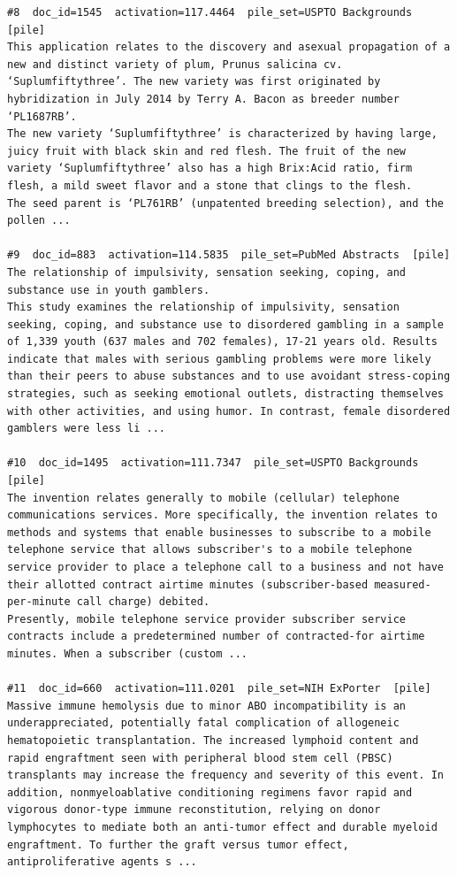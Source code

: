 \begin{verbatim}
#8  doc_id=1545  activation=117.4464  pile_set=USPTO Backgrounds  [pile]
This application relates to the discovery and asexual propagation of a new and distinct variety of plum, Prunus salicina cv. ‘Suplumfiftythree’. The new variety was first originated by hybridization in July 2014 by Terry A. Bacon as breeder number ‘PL1687RB’.
The new variety ‘Suplumfiftythree’ is characterized by having large, juicy fruit with black skin and red flesh. The fruit of the new variety ‘Suplumfiftythree’ also has a high Brix:Acid ratio, firm flesh, a mild sweet flavor and a stone that clings to the flesh.
The seed parent is ‘PL761RB’ (unpatented breeding selection), and the pollen ...

#9  doc_id=883  activation=114.5835  pile_set=PubMed Abstracts  [pile]
The relationship of impulsivity, sensation seeking, coping, and substance use in youth gamblers.
This study examines the relationship of impulsivity, sensation seeking, coping, and substance use to disordered gambling in a sample of 1,339 youth (637 males and 702 females), 17-21 years old. Results indicate that males with serious gambling problems were more likely than their peers to abuse substances and to use avoidant stress-coping strategies, such as seeking emotional outlets, distracting themselves with other activities, and using humor. In contrast, female disordered gamblers were less li ...

#10  doc_id=1495  activation=111.7347  pile_set=USPTO Backgrounds  [pile]
The invention relates generally to mobile (cellular) telephone communications services. More specifically, the invention relates to methods and systems that enable businesses to subscribe to a mobile telephone service that allows subscriber's to a mobile telephone service provider to place a telephone call to a business and not have their allotted contract airtime minutes (subscriber-based measured-per-minute call charge) debited.
Presently, mobile telephone service provider subscriber service contracts include a predetermined number of contracted-for airtime minutes. When a subscriber (custom ...

#11  doc_id=660  activation=111.0201  pile_set=NIH ExPorter  [pile]
Massive immune hemolysis due to minor ABO incompatibility is an underappreciated, potentially fatal complication of allogeneic hematopoietic transplantation. The increased lymphoid content and rapid engraftment seen with peripheral blood stem cell (PBSC) transplants may increase the frequency and severity of this event. In addition, nonmyeloablative conditioning regimens favor rapid and vigorous donor-type immune reconstitution, relying on donor lymphocytes to mediate both an anti-tumor effect and durable myeloid engraftment. To further the graft versus tumor effect, antiproliferative agents s ...


\end{verbatim}
